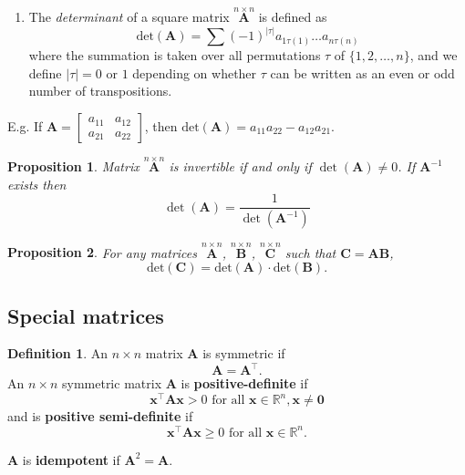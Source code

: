 \documentclass[
]{book}
\providecommand{\tightlist}{%
  \setlength{\itemsep}{0pt}\setlength{\parskip}{0pt}}
\newtheorem{proposition}{Proposition}[chapter]
\theoremstyle{definition}
\newtheorem{definition}{Definition}[chapter]
\theoremstyle{definition}
\theoremstyle{definition}
\theoremstyle{definition}
\theoremstyle{remark}
\begin{document}
\begin{enumerate}
\def\labelenumi{\arabic{enumi}.}
\setcounter{enumi}{6}
\tightlist
\item
  The \emph{determinant} of a square matrix \(\stackrel{n\times n}{\mathbf A}\) is
  defined as
  \[ \text{det}({\mathbf A})=\sum (-1)^{|\tau |} a_{1\tau(1)}\dots a_{n\tau (n)} \]
  where the summation is taken over all permutations \(\tau\) of \(\{1,2,\dots ,n\}\),
  and we define \(|\tau |=0\) or \(1\) depending on whether \(\tau\) can be written as an even or
  odd number of transpositions.
\end{enumerate}

E.g. If \({\mathbf A}=\left[
\begin{array}{cc}
a_{11}&a_{12}\\
a_{21}&a_{22}
\end{array}
\right]\),
then \(\text{det}({\mathbf A})=a_{11}a_{22}-a_{12}a_{21}\).

\begin{proposition}
\protect\hypertarget{prp:det1}{}\label{prp:det1}Matrix \(\stackrel{n\times n}{\mathbf A}\) is invertible if and only if \(\det(\mathbf A)\not = 0\). If \(\mathbf A^{-1}\) exists then
\[\det(\mathbf A)=\frac{1}{\det(\mathbf A^{-1})}\]
\end{proposition}

\begin{proposition}
\protect\hypertarget{prp:det3}{}\label{prp:det3}For any matrices \(\stackrel{n\times n}{\mathbf A}\),
\(\stackrel{n\times n}{\mathbf B}\), \(\stackrel{n\times n}{\mathbf C}\) such that \({\mathbf C}={\mathbf{AB}}\),
\[ \text{det}({\mathbf C})=\text{det}({\mathbf A}) \cdot \text{det}({\mathbf B}).\]
\end{proposition}

\subsection{Special matrices}\label{special-matrices}

\begin{definition}
\protect\hypertarget{def:posdef}{}\label{def:posdef}An \(n\times n\) matrix \(\mathbf A\) is symmetric if
\[\mathbf A= \mathbf A^\top.\]
An \(n\times n\) symmetric matrix \(\mathbf A\) is \textbf{positive-definite} if
\[\mathbf x^\top \mathbf A\mathbf x>0 \mbox{ for all } \mathbf x\in \mathbb{R}^n, \mathbf x\not = {\boldsymbol 0}\]
and is \textbf{positive semi-definite} if
\[\mathbf x^\top \mathbf A\mathbf x\geq 0 \mbox{ for all } \mathbf x\in \mathbb{R}^n.\]

\(\mathbf A\) is \textbf{idempotent} if \(\mathbf A^2=\mathbf A\).
\end{definition}
\end{document}
